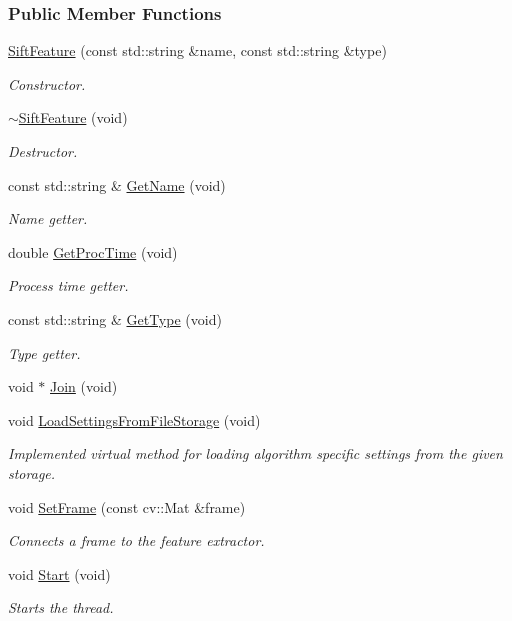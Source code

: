 \subsubsection*{Public Member Functions}
\begin{DoxyCompactItemize}
\item 
\hyperlink{group___feature_extractor_a9fc5b3a0395374f1bb07fad1ad9a2494}{Sift\-Feature} (const std\-::string \&name, const std\-::string \&type)
\begin{DoxyCompactList}\small\item\em Constructor. \end{DoxyCompactList}\item 
\hyperlink{group___feature_extractor_af35ea372a4c8aaf8a7486ec688214527}{$\sim$\-Sift\-Feature} (void)
\begin{DoxyCompactList}\small\item\em Destructor. \end{DoxyCompactList}\item 
const std\-::string \& \hyperlink{group___feature_extractor_a5f69ca2455d5eec4493dbf115d00d5c9}{Get\-Name} (void)
\begin{DoxyCompactList}\small\item\em Name getter. \end{DoxyCompactList}\item 
double \hyperlink{group___feature_extractor_ad07a3104192b50d911eee634a0be009d}{Get\-Proc\-Time} (void)
\begin{DoxyCompactList}\small\item\em Process time getter. \end{DoxyCompactList}\item 
const std\-::string \& \hyperlink{group___feature_extractor_a6724c19006d495bd6a9c8c6029236ebc}{Get\-Type} (void)
\begin{DoxyCompactList}\small\item\em Type getter. \end{DoxyCompactList}\item 
void $\ast$ \hyperlink{group___core_a8f33f7750321d5df9188033e7e3e300d}{Join} (void)
\item 
void \hyperlink{group___feature_extractor_af19316d789598f612ee150deb2ee5137}{Load\-Settings\-From\-File\-Storage} (void)
\begin{DoxyCompactList}\small\item\em Implemented virtual method for loading algorithm specific settings from the given storage. \end{DoxyCompactList}\item 
void \hyperlink{group___feature_extractor_a3c58d995fb2440b28db3b21b54b94815}{Set\-Frame} (const cv\-::\-Mat \&frame)
\begin{DoxyCompactList}\small\item\em Connects a frame to the feature extractor. \end{DoxyCompactList}\item 
void \hyperlink{group___core_a2b42f82341afd2747ea093b6ac8b91cb}{Start} (void)
\begin{DoxyCompactList}\small\item\em Starts the thread. \end{DoxyCompactList}\end{DoxyCompactItemize}
